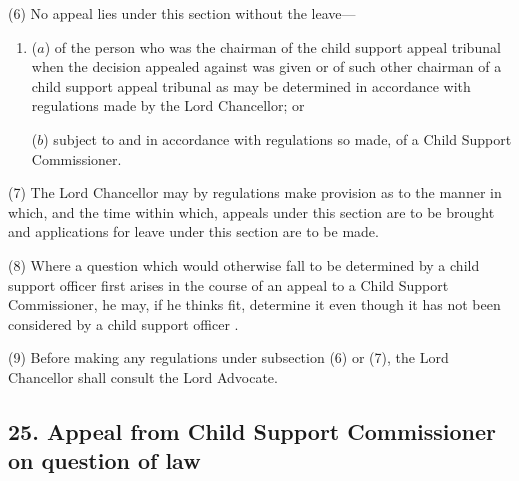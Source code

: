 \documentclass[12pt,a4paper]{article}
\begin{document}
(6) No appeal lies under this section without the leave—
\begin{enumerate}\item[]
($a$) of the person 
who was the chairman of the child support appeal tribunal 
when the decision appealed against was given or of 
such other chairman of a child support appeal tribunal 
as may be determined in accordance with regulations made by the Lord Chancellor; or

($b$) subject to and in accordance with regulations so made, of a Child Support Commissioner.
\end{enumerate}

(7) The Lord Chancellor may by regulations make provision as to the manner in which, and the time within which, appeals under this section are to be brought and applications for leave under this section are to be made.

(8) Where a question which would otherwise fall to be determined by 
a child support officer 
first arises in the course of an appeal to a Child Support Commissioner, he may, if he thinks fit, determine it even though it has not been considered by 
a child support officer%
.

(9) Before making any regulations under subsection (6)  or (7), the Lord Chancellor shall consult the Lord Advocate.


\subsection{25. Appeal from Child Support Commissioner on question of law}
\end{document}

